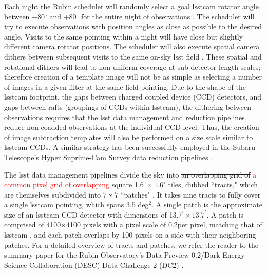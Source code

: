 \documentclass[preprintm,linenumbers]{aastex631}
\providecommand{\red}[1]{\textcolor{red}{#1}}
\begin{document}
	Each night the Rubin scheduler will randomly select a goal \gls*{lsstcam} rotator angle between $-$80$^{\circ}$ and +80$^{\circ}$ for the entire night of observations \citep{v4.0sims}. 
 The scheduler will try to execute observations with position angles as close as possible to the desired angle. Visits to the same pointing within a night will have close but slightly different camera rotator positions. 
 The scheduler will also execute spatial camera dithers between subsequent visits to the same on-sky \gls*{lsst} field \citep{v4.0sims}. 
These spatial and rotational dithers will lead to non-uniform coverage at sub-detector length scales; therefore creation of a template image will not be as simple as selecting a number of images in a given filter at the same field pointing. 
 Due to the shape of the \gls*{lsstcam} footprint, the gaps between charged coupled device (CCD) detectors, and gaps between rafts (groupings of CCDs within \gls*{lsstcam}), the dithering between observations requires that the \gls*{lsst} data management and reduction pipelines reduce non-coadded observations at the individual CCD level. Thus, the creation of image subtraction templates will also be performed on a size scale similar to \gls*{lsstcam} CCDs.
 A similar strategy has been successfully employed in the Subaru Telescope's Hyper Suprime-Cam Survey data reduction pipelines \citep{2018PASJ...70S...5B}. 
 
	
	The \gls*{lsst} data management pipelines divide the sky into \sout{an overlapping grid of} \red{a common pixel grid of overlapping} square 1.6$^{\circ} \times 1.6^{\circ}$ tiles, dubbed ``tracts," which are themselves subdivided into $7 \times 7$ ``patches" \citep[see Figure \ref{fig:tractsandpatches} and][]{2018PASJ...70S...5B, LDM-151}. 
	It takes nine tracts to fully cover a single \gls*{lsstcam} pointing, which spans 3.5 deg$^2$. A single patch is the approximate size of an \gls*{lsstcam} CCD detector with dimensions of 13.7$^{\prime} \times 13.7^{\prime}$. A patch is comprised of 4100$\times$4100 pixels with a pixel scale of 0.2\arcsec per pixel, matching that of \gls*{lsstcam} \citep{2019ApJ...873..111I,LDM-151}, and each patch overlaps by 100 pixels on a side with their neighboring patches.  For a detailed overview of tracts and patches, we refer the reader to the summary paper for the Rubin Observatory's Data Preview 0.2/Dark Energy Science Collaboration (DESC) Data Challenge 2 (DC2) \citep{2021ApJS..253...31L}.  
	
\end{document}
